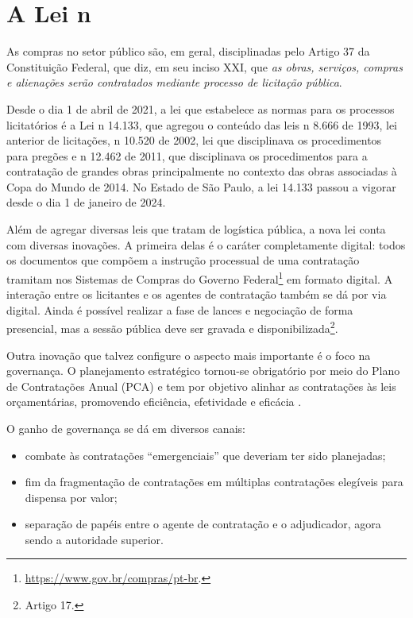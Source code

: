 \chapter{A Lei n}
\label{cap:14133}

As compras no setor público são, em geral, disciplinadas pelo Artigo 37 da Constituição Federal, que diz, em seu inciso XXI, que \emph{as obras, serviços, compras e alienações serão contratados mediante processo de licitação pública}.

Desde o dia 1{\textordmasculine} de abril de 2021, a lei que estabelece as normas para os processos licitatórios é a Lei n{\textordmasculine} 14.133, que agregou o conteúdo das leis n{\textordmasculine} 8.666 de 1993, lei anterior de licitações, n{\textordmasculine} 10.520 de 2002, lei que disciplinava os procedimentos para pregões e n{\textordmasculine} 12.462 de 2011, que disciplinava os procedimentos para a contratação de grandes obras principalmente no contexto das obras associadas à Copa do Mundo de 2014. No Estado de São Paulo, a lei 14.133 passou a vigorar desde o dia 1{\textordmasculine} de janeiro de 2024.

Além de agregar diversas leis que tratam de logística pública, a nova lei conta com diversas inovações. A primeira delas é o caráter completamente digital: todos os documentos que compõem a instrução processual de uma contratação tramitam nos Sistemas de Compras do Governo Federal\footnote{\url{https://www.gov.br/compras/pt-br}.} em formato digital. A interação entre os licitantes e os agentes de contratação também se dá por via digital. Ainda é possível realizar a fase de lances e negociação de forma presencial, mas a sessão pública deve ser gravada e disponibilizada\footnote{Artigo 17.}.

Outra inovação que talvez configure o aspecto mais importante é o foco na governança. O planejamento estratégico tornou-se obrigatório por meio do Plano de Contratações Anual (PCA) e tem por objetivo alinhar as contratações às leis orçamentárias, promovendo eficiência, efetividade e eficácia \citet{TCE2022}.

O ganho de governança se dá em diversos canais:
\begin{itemize}
    \item {combate às contratações ``emergenciais'' que deveriam ter sido planejadas;}
    \item {fim da fragmentação de contratações em múltiplas contratações elegíveis para dispensa por valor;}
    \item {separação de papéis entre o agente de contratação e o adjudicador, agora sendo a autoridade superior.}
\end{itemize}

